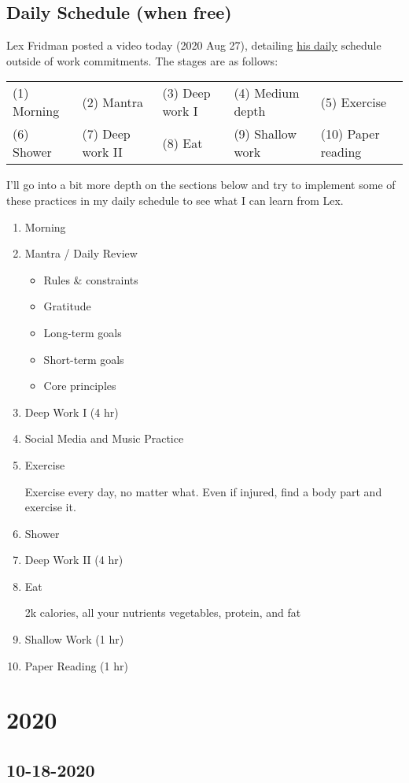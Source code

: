 \section{Daily Schedule (when free)}

Lex Fridman posted a video today (2020 Aug 27), detailing  \href{https://youtu.be/0m3hGZvD-0s}{his daily} schedule outside of work commitments. The stages are as follows:

\begin{tabular}{lllll}
	(1) Morning & (2) Mantra  &  (3) Deep work I & (4) Medium depth  & (5) Exercise \\
	(6) Shower & (7) Deep work II & (8) Eat & (9) Shallow work  & (10) Paper reading \\
\end{tabular}

I'll go into a bit more depth on the sections below and try to implement some of these practices in my daily schedule to see what I can learn from Lex.

\begin{enumerate}
\item
	Morning

\item
	Mantra / Daily Review
	\begin{itemize}
	\item
		Rules \& constraints
	\item
		Gratitude
	\item
		Long-term goals
	\item
		Short-term goals
	\item
		Core principles
	\end{itemize}

\item
	Deep Work I (4 hr)

\item
	Social Media and Music Practice

\item
	Exercise

	Exercise every day, no matter what. Even if injured, find a body part and exercise it.

\item
	Shower

\item
	Deep Work II (4 hr)

\item
	Eat

	2k calories, all your nutrients
	vegetables, protein, and fat

\item
	Shallow Work (1 hr)

\item
	Paper Reading (1 hr)
\end{enumerate}


\chapter{2020}

\section*{10-18-2020}
%
%




